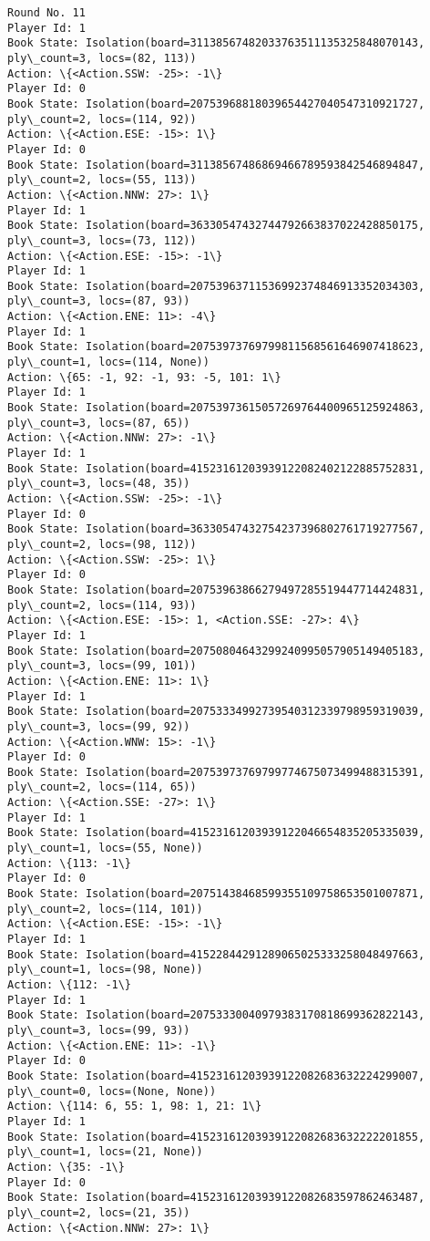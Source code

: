 \documentclass[11pt]{article}
\begin{document}
\begin{Verbatim}[commandchars=\\\{\}]
Round No. 11
Player Id: 1
Book State: Isolation(board=31138567482033763511135325848070143, ply\_count=3, locs=(82, 113))
Action: \{<Action.SSW: -25>: -1\}
Player Id: 0
Book State: Isolation(board=20753968818039654427040547310921727, ply\_count=2, locs=(114, 92))
Action: \{<Action.ESE: -15>: 1\}
Player Id: 0
Book State: Isolation(board=31138567486869466789593842546894847, ply\_count=2, locs=(55, 113))
Action: \{<Action.NNW: 27>: 1\}
Player Id: 1
Book State: Isolation(board=36330547432744792663837022428850175, ply\_count=3, locs=(73, 112))
Action: \{<Action.ESE: -15>: -1\}
Player Id: 1
Book State: Isolation(board=20753963711536992374846913352034303, ply\_count=3, locs=(87, 93))
Action: \{<Action.ENE: 11>: -4\}
Player Id: 1
Book State: Isolation(board=20753973769799811568561646907418623, ply\_count=1, locs=(114, None))
Action: \{65: -1, 92: -1, 93: -5, 101: 1\}
Player Id: 1
Book State: Isolation(board=20753973615057269764400965125924863, ply\_count=3, locs=(87, 65))
Action: \{<Action.NNW: 27>: -1\}
Player Id: 1
Book State: Isolation(board=41523161203939122082402122885752831, ply\_count=3, locs=(48, 35))
Action: \{<Action.SSW: -25>: -1\}
Player Id: 0
Book State: Isolation(board=36330547432754237396802761719277567, ply\_count=2, locs=(98, 112))
Action: \{<Action.SSW: -25>: 1\}
Player Id: 0
Book State: Isolation(board=20753963866279497285519447714424831, ply\_count=2, locs=(114, 93))
Action: \{<Action.ESE: -15>: 1, <Action.SSE: -27>: 4\}
Player Id: 1
Book State: Isolation(board=20750804643299240995057905149405183, ply\_count=3, locs=(99, 101))
Action: \{<Action.ENE: 11>: 1\}
Player Id: 1
Book State: Isolation(board=20753334992739540312339798959319039, ply\_count=3, locs=(99, 92))
Action: \{<Action.WNW: 15>: -1\}
Player Id: 0
Book State: Isolation(board=20753973769799774675073499488315391, ply\_count=2, locs=(114, 65))
Action: \{<Action.SSE: -27>: 1\}
Player Id: 1
Book State: Isolation(board=41523161203939122046654835205335039, ply\_count=1, locs=(55, None))
Action: \{113: -1\}
Player Id: 0
Book State: Isolation(board=20751438468599355109758653501007871, ply\_count=2, locs=(114, 101))
Action: \{<Action.ESE: -15>: -1\}
Player Id: 1
Book State: Isolation(board=41522844291289065025333258048497663, ply\_count=1, locs=(98, None))
Action: \{112: -1\}
Player Id: 1
Book State: Isolation(board=20753330040979383170818699362822143, ply\_count=3, locs=(99, 93))
Action: \{<Action.ENE: 11>: -1\}
Player Id: 0
Book State: Isolation(board=41523161203939122082683632224299007, ply\_count=0, locs=(None, None))
Action: \{114: 6, 55: 1, 98: 1, 21: 1\}
Player Id: 1
Book State: Isolation(board=41523161203939122082683632222201855, ply\_count=1, locs=(21, None))
Action: \{35: -1\}
Player Id: 0
Book State: Isolation(board=41523161203939122082683597862463487, ply\_count=2, locs=(21, 35))
Action: \{<Action.NNW: 27>: 1\}


\end{Verbatim}
\end{document}
